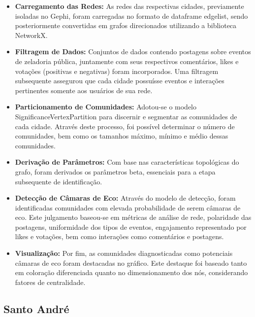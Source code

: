 \begin{itemize}
	\item \textbf{Carregamento das Redes:} As redes das respectivas cidades, previamente isoladas no Gephi, foram carregadas no formato de dataframe edgelist, sendo posteriormente convertidas em grafos direcionados utilizando a biblioteca NetworkX.
	\item \textbf{Filtragem de Dados:} Conjuntos de dados contendo postagens sobre eventos de zeladoria pública, juntamente com seus respectivos comentários, likes e votações (positivas e negativas) foram incorporados. Uma filtragem subsequente assegurou que cada cidade possuísse eventos e interações pertinentes somente aos usuários de sua rede.
	\item \textbf{Particionamento de Comunidades:} Adotou-se o modelo SignificanceVertexPartition para discernir e segmentar as comunidades de cada cidade. Através deste processo, foi possível determinar o número de comunidades, bem como os tamanhos máximo, mínimo e médio dessas comunidades.
	\item \textbf{Derivação de Parâmetros:} Com base nas características topológicas do grafo, foram derivados os parâmetros beta, essenciais para a etapa subsequente de identificação.
	\item \textbf{Detecção de Câmaras de Eco:} Através do modelo de detecção, foram identificadas comunidades com elevada probabilidade de serem câmaras de eco. Este julgamento baseou-se em métricas de análise de rede, polaridade das postagens, uniformidade dos tipos de eventos, engajamento representado por likes e votações, bem como interações como comentários e postagens.
	\item \textbf{Visualização:} Por fim, as comunidades diagnosticadas como potenciais câmaras de eco foram destacadas no gráfico. Este destaque foi baseado tanto em coloração diferenciada quanto no dimensionamento dos nós, considerando fatores de centralidade.
\end{itemize}

\subsection{Santo André}

